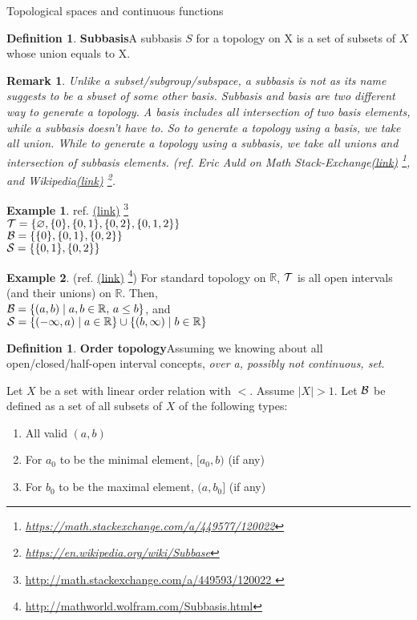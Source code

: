 \documentclass{report}
\let\emptyset\varnothing
\newcommand*{\link}[1]{\href{#1}{(\underline{link})}%
  \footnote{\url{#1}}}
\newtheorem*{remark}{Remark}
\theoremstyle{definition}
\newtheorem{definition}[theorem]{Definition}
\newtheorem{example}{Example}[theorem]
\newcommand{\defn}[1]{\textbf{#1}\label{#1}\index{#1}}
\newcommand{\set}[1]{\ensuremath\{#1\}}
\newcommand{\RR}{\mathbb{R}}
\begin{document}
\begin{chapter}{Topological spaces and continuous functions}
  \begin{definition}\defn{Subbasis}
    A subbasis $S$ for a topology on X is a set of subsets of $X$
    whose union equals to X.
  \end{definition}
  \begin{remark}
    Unlike a subset/subgroup/subspace, a subbasis is not as its name
    suggests to be a sbuset of some other basis. Subbasis and basis
    are two different way to generate a topology. A basis includes all
    intersection of two basis elements, while a subbasis doesn't have
    to. So to generate a topology using a basis, we take all
    union. While to generate a topology using a subbasis, we take all
    unions and intersection of subbasis elements. (ref. {Eric Auld on
      Math
      Stack-Exchange\link{https://math.stackexchange.com/a/449577/120022}},
    and Wikipedia\link{https://en.wikipedia.org/wiki/Subbase}.
  \end{remark}
  \begin{example}ref. \link{http://math.stackexchange.com/a/449593/120022
     }\\
    $\T=\set{\emptyset, \set{0}, \set{0,1}, \set{0,2}, \set{0,1,2}}$
    \\
    $\B=\set{\set{0},\set{0,1},\set{0,2}}$ \\
    $\mathcal{S}=\set{\set{0,1},\set{0,2}}$
  \end{example}
  \begin{example}
    (ref. \link{http://mathworld.wolfram.com/Subbasis.html}) For standard topology on $\RR$, $\mathcal{T}$ is all open intervals (and
    their unions) on $\RR$. Then, \\
    $\B=\set{(a,b)\mid a,b\in\RR,\,a\leq b}$, and \\
    $\mathcal{S}=\set{(-\infty,a)\mid
      a\in\RR}\cup\set{(b,\infty)\mid b\in \RR}$ \\

  \end{example}

  \begin{definition}\defn{Order topology}
    Assuming we knowing about all open/closed/half-open interval
    concepts, \emph{over a, possibly not continuous, set}.

    Let $X$ be a set with linear order relation with $<$. Assume
    $|X|>1$. Let $\mathcal{B}$ be defined as a set of all subsets of $X$ of the
    following types:
    \begin{enumerate}
    \item All valid $(a,b)$
    \item For $a_0$ to be the minimal element, $[a_0,b)$ (if any)
    \item For $b_0$ to be the maximal element, $(a,b_0]$ (if any)
    \end{enumerate}


\end{definition}
\end{chapter}
\end{document}
